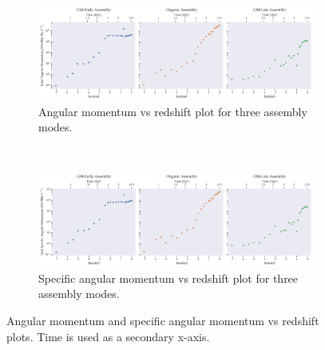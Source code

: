 \documentclass{article}
\begin{document}
	\begin{figure}
		\centering
		\begin{subfigure} {\columnwidth}
				\centering 
				\includegraphics[width=\columnwidth]{../../plots/angular_momentum/redshift-net_angular_momentum.png}
				\caption{Angular momentum vs redshift plot for three assembly modes.}
		\end{subfigure} \\
			\vspace{1cm}
		\begin{subfigure} {\columnwidth}
				\centering 
				\includegraphics[width=\columnwidth]{../../plots/angular_momentum/redshift-net_specific_angular_momentum.png}
				\caption{Specific angular momentum vs redshift plot for three assembly modes.}
		\end{subfigure}
		
		\caption{Angular momentum and specific angular momentum vs redshift plots. Time is used as a secondary x-axis.}
	\end{figure}

	\clearpage
\end{document}
